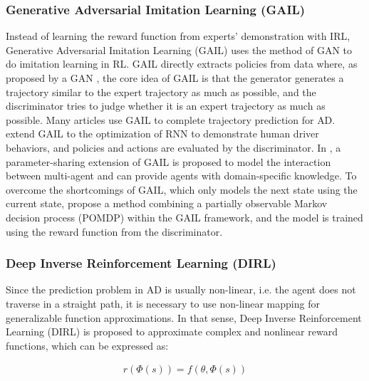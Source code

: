 \subsubsection{Generative Adversarial Imitation Learning (GAIL)}
\label{subsubsec:2_gail_mp}

Instead of learning the reward function from experts’ demonstration with IRL, Generative Adversarial Imitation Learning (GAIL) \cite{ho2016generative} uses the method of GAN to do imitation learning in RL. GAIL directly extracts policies from data where, as proposed by a \ac{GAN} \cite{goodfellow2020generative}, the core idea of GAIL is that the generator generates a trajectory similar to the expert trajectory as much as possible, and the discriminator tries to judge whether it is an expert trajectory as much as possible. Many articles use GAIL to complete trajectory prediction for \ac{AD}. \cite{kuefler2017imitating} extend GAIL to the optimization of RNN to demonstrate human driver behaviors, and policies and actions are evaluated by the discriminator. In \cite{bhattacharyya2022modeling}, a parameter-sharing extension of GAIL is proposed to model the interaction between multi-agent and can provide agents with domain-specific knowledge. To overcome the shortcomings of GAIL, which only models the next state using the current state, \cite{choi2021trajgail} propose a method combining a partially observable Markov decision process (POMDP) within the GAIL framework, and the model is trained using the reward function from the discriminator.

\subsubsection{Deep Inverse Reinforcement Learning (DIRL)}
\label{subsubsec:2_dirl_mp}

Since the prediction problem in \ac{AD} is usually non-linear, i.e. the agent does not traverse in a straight path, it is necessary to use non-linear mapping for generalizable function approximations. In that sense, Deep Inverse Reinforcement Learning (DIRL) is proposed \cite{wulfmeier2015maximum} to approximate complex and nonlinear reward functions, which can be expressed as:

\begin{equation}
\begin{aligned}
r(\Phi(s))=f(\theta, \Phi(s))
\end{aligned}
\end{equation}


